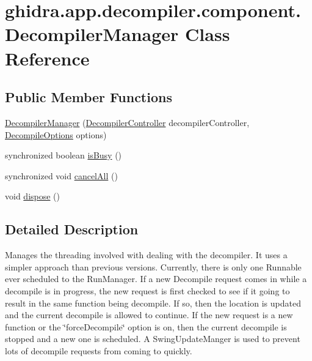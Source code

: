\hypertarget{classghidra_1_1app_1_1decompiler_1_1component_1_1_decompiler_manager}{}\section{ghidra.\+app.\+decompiler.\+component.\+Decompiler\+Manager Class Reference}
\label{classghidra_1_1app_1_1decompiler_1_1component_1_1_decompiler_manager}
\subsection*{Public Member Functions}
\begin{DoxyCompactItemize}
\item 
\mbox{\hyperlink{classghidra_1_1app_1_1decompiler_1_1component_1_1_decompiler_manager_a86b780d49e09db710dfd6c1cbc8b024a}{Decompiler\+Manager}} (\mbox{\hyperlink{classghidra_1_1app_1_1decompiler_1_1component_1_1_decompiler_controller}{Decompiler\+Controller}} decompiler\+Controller, \mbox{\hyperlink{classghidra_1_1app_1_1decompiler_1_1_decompile_options}{Decompile\+Options}} options)
\item 
synchronized boolean \mbox{\hyperlink{classghidra_1_1app_1_1decompiler_1_1component_1_1_decompiler_manager_a09fc0d005fa5d29e5a348cefbeb0e0ef}{is\+Busy}} ()
\item 
synchronized void \mbox{\hyperlink{classghidra_1_1app_1_1decompiler_1_1component_1_1_decompiler_manager_af4c7e68ce6789484e439dd7501856896}{cancel\+All}} ()
\item 
void \mbox{\hyperlink{classghidra_1_1app_1_1decompiler_1_1component_1_1_decompiler_manager_a8f2694c41dd71e004e75a5603274865f}{dispose}} ()
\end{DoxyCompactItemize}


\subsection{Detailed Description}
Manages the threading involved with dealing with the decompiler. It uses a simpler approach than previous versions. Currently, there is only one Runnable ever scheduled to the Run\+Manager. If a new Decompile request comes in while a decompile is in progress, the new request is first checked to see if it going to result in the same function being decompile. If so, then the location is updated and the current decompile is allowed to continue. If the new request is a new function or the \char`\"{}force\+Decompile\char`\"{} option is on, then the current decompile is stopped and a new one is scheduled. A Swing\+Update\+Manger is used to prevent lots of decompile requests from coming to quickly. 

